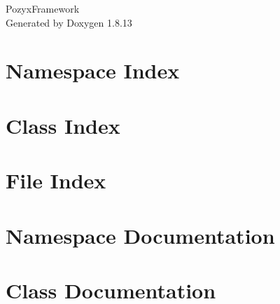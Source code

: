 \documentclass[twoside]{book}
\newcommand{\+}{\discretionary{\mbox{\scriptsize$\hookleftarrow$}}{}{}}
\newcommand{\clearemptydoublepage}{%
  \newpage{\pagestyle{empty}\cleardoublepage}%
}
\begin{document}
\hypersetup{pageanchor=false,
             bookmarksnumbered=true,
             pdfencoding=unicode
            }
\begin{titlepage}
\vspace*{7cm}
\begin{center}%
{\Large Pozyx\+Framework }\\
\vspace*{1cm}
{\large Generated by Doxygen 1.8.13}\\
\end{center}
\end{titlepage}
\clearemptydoublepage
{}
\tableofcontents
\clearemptydoublepage
{}
\hypersetup{pageanchor=true}

\chapter{Namespace Index}

\chapter{Class Index}

\chapter{File Index}

\chapter{Namespace Documentation}






\chapter{Class Documentation}










\end{document}
